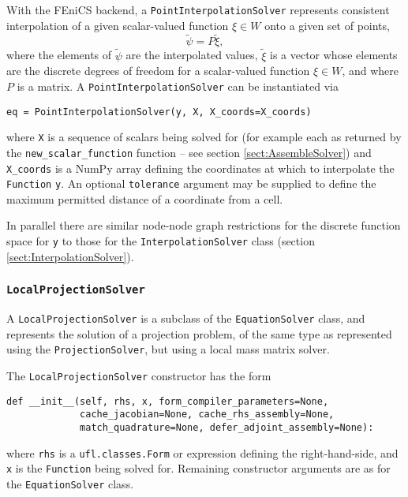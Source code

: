 \documentclass[11pt]{article}
\begin{document}
With the FEniCS backend, a \texttt{PointInterpolationSolver} represents
consistent interpolation of a given scalar-valued function $\xi \in W$ onto a
given set of points,
\begin{equation*}
  \tilde{\psi} = P \tilde{\xi},
\end{equation*}
where the elements of $\tilde{\psi}$ are the interpolated values, $\tilde{\xi}$
is a vector whose elements are the discrete degrees of freedom for a
scalar-valued function $\xi \in W$, and where $P$ is a matrix. A
\texttt{PointInterpolationSolver} can be instantiated via
\begin{lstlisting}
eq = PointInterpolationSolver(y, X, X_coords=X_coords)
\end{lstlisting}
where \texttt{X} is a sequence of scalars being solved for (for example each as
returned by the \texttt{new\_scalar\_function} function -- see section
\ref{sect:AssembleSolver}) and \texttt{X\_coords} is a NumPy array defining the
coordinates at which to interpolate the \texttt{Function} \texttt{y}. An
optional \texttt{tolerance} argument may be supplied to define the maximum
permitted distance of a coordinate from a cell.

In parallel there are similar node-node graph restrictions for the discrete
function space for \texttt{y} to those for the \texttt{InterpolationSolver}
class (section \ref{sect:InterpolationSolver}).

\subsubsection{\texttt{LocalProjectionSolver}}

A \texttt{LocalProjectionSolver} is a subclass of the \texttt{EquationSolver}
class, and represents the solution of a projection problem, of the same type as
represented using the \texttt{ProjectionSolver}, but using a local mass matrix
solver.

The \texttt{LocalProjectionSolver} constructor has the form
\begin{lstlisting}
def __init__(self, rhs, x, form_compiler_parameters=None,
             cache_jacobian=None, cache_rhs_assembly=None,
             match_quadrature=None, defer_adjoint_assembly=None):
\end{lstlisting}
where \texttt{rhs} is a \texttt{ufl.classes.Form} or expression defining the
right-hand-side, and \texttt{x} is the \texttt{Function} being solved for.
Remaining constructor arguments are as for the \texttt{EquationSolver} class.
\end{document}
